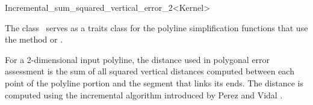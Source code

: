 
\begin{ccRefClass}{Incremental_sum_squared_vertical_error_2<Kernel>}

\ccDefinition
  
The class \ccRefName\ serves as a traits class for the polyline
simplification functions that use the method  or
. 

For a 2-dimensional input polyline, the distance used in polygonal error
assessment is the sum of all squared vertical distances computed
between each point of the polyline portion and the segment that links its
ends. The distance is computed using the incremental algorithm
introduced by Perez and Vidal \cite{cgal:pv-opadc-94}.



\ccIsModel



\ccTypes
{}


\ccSeeAlso


\end{ccRefClass}

